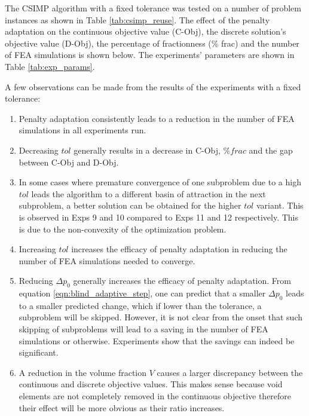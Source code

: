   
  

  The CSIMP algorithm with a fixed tolerance was tested on a number of problem instances as shown in Table \ref{tab:csimp_reuse}. The effect of the penalty adaptation on the continuous objective value (C-Obj), the discrete solution's objective value (D-Obj), the percentage of fractionness (\% frac) and the number of FEA simulations is shown below. The experiments' parameters are shown in Table \ref{tab:exp_params}. 

  A few observations can be made from the results of the experiments with a fixed tolerance:
  \begin{enumerate}
    \item Penalty adaptation consistently leads to a reduction in the number of FEA simulations in all experiments run.
    \item Decreasing $tol$ generally results in a decrease in C-Obj, $\% frac$ and the gap between C-Obj and D-Obj.
    \item In some cases where premature convergence of one subproblem due to a high $tol$ leads the algorithm to a different basin of attraction in the next subproblem, a better solution can be obtained for the higher $tol$ variant. This is observed in Exps 9 and 10 compared to Exps 11 and 12 respectively. This is due to the non-convexity of the optimization problem.
    \item Increasing $tol$ increases the efficacy of penalty adaptation in reducing the number of FEA simulations needed to converge.
    \item Reducing $\Delta p_0$ generally increases the efficacy of penalty adaptation. From equation \ref{eqn:blind_adaptive_step}, one can predict that a smaller $\Delta p_0$ leads to a smaller predicted change, which if lower than the tolerance, a subproblem will be skipped. However, it is not clear from the onset that such skipping of subproblems will lead to a saving in the number of FEA simulations or otherwise. Experiments show that the savings can indeed be significant.
    \item A reduction in the volume fraction $V$ causes a larger discrepancy between the continuous and discrete objective values. This makes sense because void elements are not completely removed in the continuous objective therefore their effect will be more obvious as their ratio increases.
  \end{enumerate}
  
